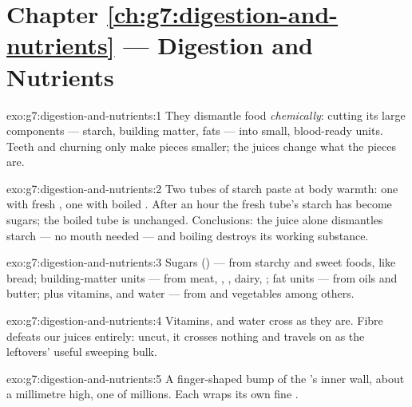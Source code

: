 \section*{Chapter \ref{ch:g7:digestion-and-nutrients} --- Digestion and Nutrients}

\begin{solution}{exo:g7:digestion-and-nutrients:1}
They dismantle food \emph{chemically}: cutting its large
components --- starch, building matter, fats --- into
small, blood-ready units. Teeth and churning only make
pieces smaller; the juices change what the pieces are.
\end{solution}

\begin{solution}{exo:g7:digestion-and-nutrients:2}
Two tubes of starch paste at body warmth: one with fresh
, one with boiled . After an hour the fresh
tube's starch has become sugars; the boiled tube is
unchanged. Conclusions: the juice alone dismantles starch
--- no mouth needed --- and boiling destroys its working
substance.
\end{solution}

\begin{solution}{exo:g7:digestion-and-nutrients:3}
Sugars () --- from starchy and sweet foods, like
bread; building-matter units --- from meat, , ,
dairy, ; fat units --- from oils and butter; plus
vitamins,  and water --- from  and
vegetables among others.
\end{solution}

\begin{solution}{exo:g7:digestion-and-nutrients:4}
Vitamins,  and water cross as they are.
Fibre defeats our juices entirely: uncut, it crosses
nothing and travels on as the leftovers' useful sweeping
bulk.
\end{solution}

\begin{solution}{exo:g7:digestion-and-nutrients:5}
A finger-shaped bump of the 's inner wall,
about a millimetre high, one of millions. Each wraps its
own fine .
\end{solution}

